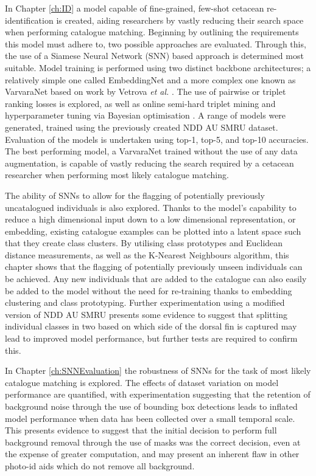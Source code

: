In Chapter \ref{ch:ID} a model capable of fine-grained, few-shot cetacean re-identification is created, aiding researchers by vastly reducing their search space when performing catalogue matching. Beginning by outlining the requirements this model must adhere to, two possible approaches are evaluated. Through this, the use of a Siamese Neural Network (SNN) based approach is determined most suitable. Model training is performed using two distinct backbone architectures; a relatively simple one called EmbeddingNet and a more complex one known as VarvaraNet based on work by Vetrova \textit{et al.} \cite{vetrova_hidden_2018}. The use of pairwise or triplet ranking losses is explored, as well as online semi-hard triplet mining and hyperparameter tuning via Bayesian optimisation \cite{akiba_optuna_2019}. A range of models were generated, trained using the previously created NDD AU SMRU dataset. Evaluation of the models is undertaken using top-1, top-5, and top-10 accuracies. The best performing model, a VarvaraNet trained without the use of any data augmentation, is capable of vastly reducing the search required by a cetacean researcher when performing most likely catalogue matching.

The ability of SNNs to allow for the flagging of potentially previously uncatalogued individuals is also explored. Thanks to the model's capability to reduce a high dimensional input down to a low dimensional representation, or embedding, existing catalogue examples can be plotted into a latent space such that they create class clusters. By utilising class prototypes and Euclidean distance measurements, as well as the K-Nearest Neighbours algorithm, this chapter shows that the flagging of potentially previously unseen individuals can be achieved. Any new individuals that are added to the catalogue can also easily be added to the model without the need for re-training thanks to embedding clustering and class prototyping. Further experimentation using a modified version of NDD AU SMRU presents some evidence to suggest that splitting individual classes in two based on which side of the dorsal fin is captured may lead to improved model performance, but further tests are required to confirm this.

In Chapter \ref{ch:SNNEvaluation} the robustness of SNNs for the task of most likely catalogue matching is explored. The effects of dataset variation on model performance are quantified, with experimentation suggesting that the retention of background noise through the use of bounding box detections leads to inflated model performance when data has been collected over a small temporal scale. This presents evidence to suggest that the initial decision to perform full background removal through the use of masks was the correct decision, even at the expense of greater computation, and may present an inherent flaw in other photo-id aids which do not remove all background. 

